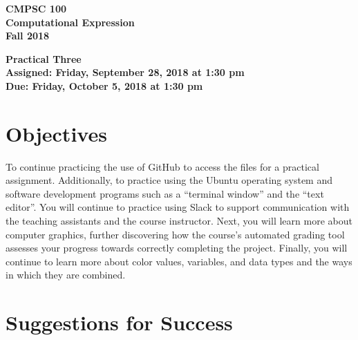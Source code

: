 \documentclass[11pt]{article}
\newcommand{\assignmentduedate}{October 5}
\newcommand{\assignmentassignedate}{September 28}
\newcommand{\assignmentnumber}{Three}
\newcommand{\labyear}{2018}
\newcommand{\labdueday}{Friday}
\newcommand{\labassignday}{Friday}
\newcommand{\labtime}{1:30 pm}
\newcommand{\assigneddate}{Assigned: \labassignday, \assignmentassignedate, \labyear{} at \labtime{}}
\newcommand{\duedate}{Due: \labdueday, \assignmentduedate, \labyear{} at \labtime{}}
\newcommand{\labtitle}[1]
{
  \begin{center}
    \begin{center}
      \bf
      CMPSC 100\\Computational Expression\\
      Fall 2018\\
      \medskip
    \end{center}
    \bf
    #1
  \end{center}
}
\begin{document}
\thispagestyle{empty}

\labtitle{Practical \assignmentnumber{} \\ \assigneddate{} \\ \duedate{}}

\section*{Objectives}

To continue practicing the use of GitHub to access the files for a practical
assignment. Additionally, to practice using the Ubuntu operating system and
software development programs such as a ``terminal window'' and the ``text
editor''. You will continue to practice using Slack to support communication
with the teaching assistants and the course instructor. Next, you will learn
more about computer graphics, further discovering how the course's automated
grading tool assesses your progress towards correctly completing the project.
Finally, you will continue to learn more about color values, variables, and data
types and the ways in which they are combined.

\section*{Suggestions for Success}
\end{document}
